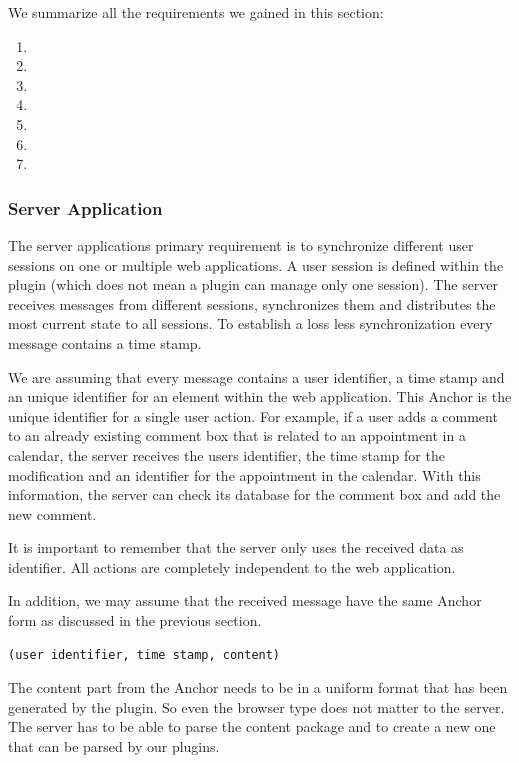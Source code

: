 We summarize all the requirements we gained in this section:

\begin{enumerate}
\item \reqPi
\item \reqPii
\item \reqPiii
\item \reqPiv
\item \reqPv
\item \reqPvi
\item \reqPvii
\end{enumerate}

\subsubsection{Server Application} \label{Social Weaver - Server Application}
The server applications primary requirement is to synchronize different user sessions on one or multiple web applications. A user session is defined within the plugin (which does not mean a plugin can manage only one session). The server receives messages from different sessions, synchronizes them and distributes the most current state to all sessions.  To establish a loss less synchronization every message contains a time stamp.

We are assuming that every message contains a user identifier, a time stamp and an unique identifier for an element within the web application. This Anchor is the unique identifier for a single user action. For example, if a user adds a comment to an already existing comment box that is related to an appointment in a calendar, the server receives the users identifier, the time stamp for the modification and an identifier for the appointment in the calendar. With this information, the server can check its database for the comment box and add the new comment. 

It is important to remember that the server only uses the received data as identifier. All actions are completely independent to the web application. 

In addition, we may assume that the received message have the same Anchor form as discussed in the previous section. 
\begin{verbatim}(user identifier, time stamp, content)\end{verbatim} 
The content part from the Anchor needs to be in a uniform format that has been generated by the plugin. So even the browser type does not matter to the server. The server has to be able to parse the content package and to create a new one that can be parsed by our plugins.

